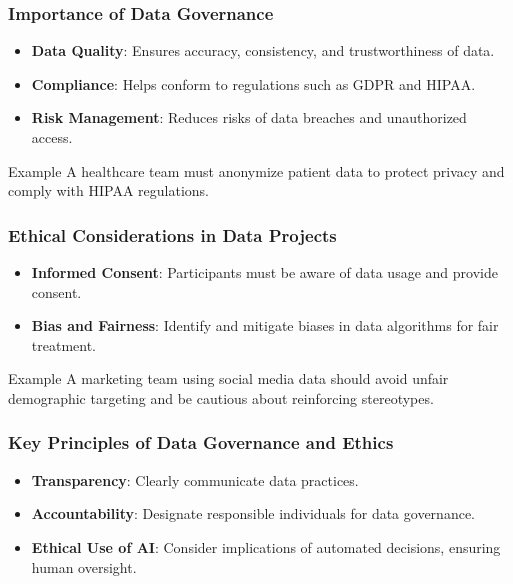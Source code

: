 \documentclass{beamer}
\begin{document}
\begin{frame}[fragile]
    \frametitle{Importance of Data Governance}
    \begin{itemize}
        \item \textbf{Data Quality}: Ensures accuracy, consistency, and trustworthiness of data.
        \item \textbf{Compliance}: Helps conform to regulations such as GDPR and HIPAA.
        \item \textbf{Risk Management}: Reduces risks of data breaches and unauthorized access.
    \end{itemize}
    \begin{block}{Example}
        A healthcare team must anonymize patient data to protect privacy and comply with HIPAA regulations.
    \end{block}
\end{frame}

\begin{frame}[fragile]
    \frametitle{Ethical Considerations in Data Projects}
    \begin{itemize}
        \item \textbf{Informed Consent}: Participants must be aware of data usage and provide consent.
        \item \textbf{Bias and Fairness}: Identify and mitigate biases in data algorithms for fair treatment.
    \end{itemize}
    \begin{block}{Example}
        A marketing team using social media data should avoid unfair demographic targeting and be cautious about reinforcing stereotypes.
    \end{block}
\end{frame}

\begin{frame}[fragile]
    \frametitle{Key Principles of Data Governance and Ethics}
    \begin{itemize}
        \item \textbf{Transparency}: Clearly communicate data practices.
        \item \textbf{Accountability}: Designate responsible individuals for data governance.
        \item \textbf{Ethical Use of AI}: Consider implications of automated decisions, ensuring human oversight.
    \end{itemize}
\end{frame}
\end{document}
